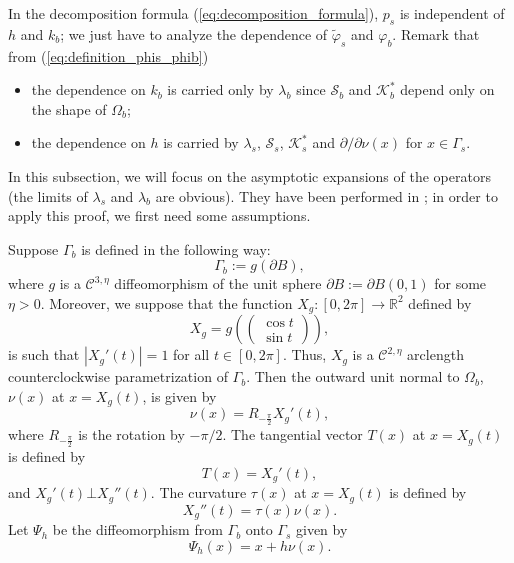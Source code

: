 In the decomposition formula (\ref{eq:decomposition_formula}), $p_s$
is independent of $h$ and $k_{b}$; we just have to analyze
the dependence of $\tilde{\varphi}_{s}$ and $\varphi_{b}$. Remark
that from (\ref{eq:definition_phis_phib})
\begin{itemize}
\item the dependence on $k_{b}$ is carried only by $\lambda_{b}$
since $\mathcal{S}_{b}$ and $\mathcal{K}_{b}^{*}$ depend only on
the shape of $\Omega_{b}$; \item the dependence on $h$ is
carried by $\lambda_{s}$, $\mathcal{S}_{s}$, $\mathcal{K}_{s}^{*}$
and $\partial/\partial\nu(x)$ for $x\in\Gamma_{s}$.
\end{itemize}
In this subsection, we will focus on the asymptotic expansions of
the operators (the limits of $\lambda_{s}$ and $\lambda_{b}$ are
obvious). They have been performed in \cite{ammari2010conductivity,zribilayer};
in order to apply this proof, we first need some assumptions.

Suppose $\Gamma_{b}$ is defined in the following way:
\[
\Gamma_{b}:=g\left(\partial B\right),
\]
 where $g$ is a $\mathcal{C}^{3,\eta}$ diffeomorphism of the unit sphere $\partial B:=\partial B(0,1)$
for some $\eta>0$. Moreover, we suppose that the function
$X_g:[0,2\pi]\rightarrow\mathbb{R}^{2}$ defined by
\[
X_g =g\left(\left(\begin{array}{c}
\cos t\\
\sin t
\end{array}\right)\right),
\]
 is such that $\left|X_g'(t)\right|=1$ for all $t\in[0,2\pi]$. Thus,
$X_g$ is a $\mathcal{C}^{2,\eta}$ arclength counterclockwise
parametrization of $\Gamma_{b}$. Then the outward unit normal to
$\Omega_{b}$, $\nu(x)$ at $x=X_g(t)$, is given by
\[
\nu(x)=R_{-\frac{\pi}{2}}X_g'(t),
\]
 where $R_{-\frac{\pi}{2}}$ is the rotation by $-\pi/2$. The tangential
vector $T(x)$ at $x =X_g(t)$ is defined by
\[
T(x)=X_g'(t),
\]
 and $X_g'(t)\bot X_g''(t)$. The curvature $\tau(x)$ at $x=X_g(t)$ is defined
by
\[
X_g''(t)=\tau(x)\nu(x).
\]
 Let $\Psi_{h}$ be the diffeomorphism from $\Gamma_{b}$ onto
$\Gamma_{s}$ given by
\begin{equation} \label{defpsidelta}
\Psi_{h}(x)=x+h\nu(x).\end{equation}


